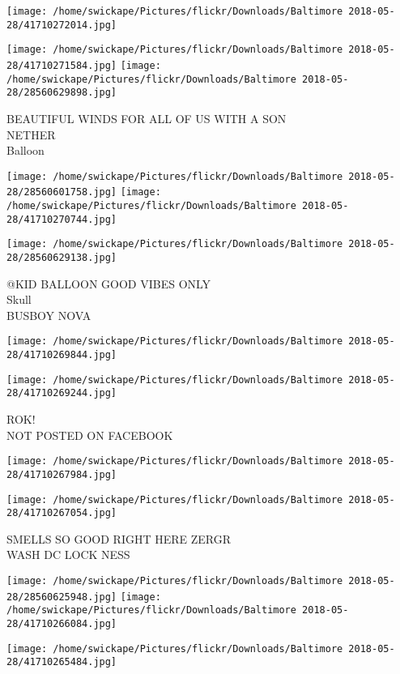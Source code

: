 \documentclass[10pt,letterpaper]{article}
\begin{document}
\texttt{[image: /home/swickape/Pictures/flickr/Downloads/Baltimore 2018-05-28/41710272014.jpg]}

\vspace{0.25in}
\texttt{[image: /home/swickape/Pictures/flickr/Downloads/Baltimore 2018-05-28/41710271584.jpg]}
\texttt{[image: /home/swickape/Pictures/flickr/Downloads/Baltimore 2018-05-28/28560629898.jpg]}

BEAUTIFUL WINDS FOR ALL OF US WITH A SON\\
NETHER\\
Balloon
\pagebreak

\texttt{[image: /home/swickape/Pictures/flickr/Downloads/Baltimore 2018-05-28/28560601758.jpg]}
\texttt{[image: /home/swickape/Pictures/flickr/Downloads/Baltimore 2018-05-28/41710270744.jpg]}

\texttt{[image: /home/swickape/Pictures/flickr/Downloads/Baltimore 2018-05-28/28560629138.jpg]}

@KID BALLOON GOOD VIBES ONLY\\
Skull\\
BUSBOY NOVA
\pagebreak

\texttt{[image: /home/swickape/Pictures/flickr/Downloads/Baltimore 2018-05-28/41710269844.jpg]}

\vspace{0.25in}
\texttt{[image: /home/swickape/Pictures/flickr/Downloads/Baltimore 2018-05-28/41710269244.jpg]}

ROK!\\
NOT POSTED ON FACEBOOK
\pagebreak

\texttt{[image: /home/swickape/Pictures/flickr/Downloads/Baltimore 2018-05-28/41710267984.jpg]}

\vspace{0.25in}
\texttt{[image: /home/swickape/Pictures/flickr/Downloads/Baltimore 2018-05-28/41710267054.jpg]}

SMELLS SO GOOD RIGHT HERE ZERGR\\
WASH DC LOCK NESS
\pagebreak

\texttt{[image: /home/swickape/Pictures/flickr/Downloads/Baltimore 2018-05-28/28560625948.jpg]}
\texttt{[image: /home/swickape/Pictures/flickr/Downloads/Baltimore 2018-05-28/41710266084.jpg]}

\vspace{0.25in}
\texttt{[image: /home/swickape/Pictures/flickr/Downloads/Baltimore 2018-05-28/41710265484.jpg]}
\end{document}
